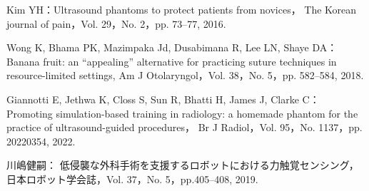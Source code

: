 \documentclass[a4paper]{jarticle}
\begin{document}
\begin{thebibliography}{9}
    Kim YH：Ultrasound phantoms to protect patients from novices，
    The Korean journal of pain，Vol. 29，No. 2，pp. 73–77, 2016.

    Wong K, Bhama PK, Mazimpaka Jd, Dusabimana R, Lee LN, Shaye DA：
    Banana fruit: an “appealing” alternative for practicing suture techniques in resource-limited settings, 
    Am J Otolaryngol，Vol. 38，No. 5，pp. 582–584, 2018.

    Giannotti E, Jethwa K, Closs S, Sun R, Bhatti H, James J, Clarke C：
    Promoting simulation-based training in radiology: a homemade phantom for the practice of ultrasound-guided procedures，
    Br J Radiol，Vol. 95，No. 1137，pp. 20220354, 2022.

    川嶋健嗣： 
    低侵襲な外科手術を支援するロボットにおける力触覚センシング，
    日本ロボット学会誌，Vol. 37，No. 5，pp.405–408, 2019.




    

\end{thebibliography}
\end{document}
